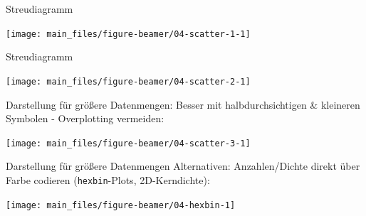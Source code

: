 \documentclass[
  10pt,
  ignorenonframetext,
]{beamer}
\begin{document}
\begin{frame}{Streudiagramm}
\label{streudiagramm}
\scriptsize

\begin{center}\texttt{[image: main\_files/figure-beamer/04-scatter-1-1]} \end{center}

\normalsize
\end{frame}

\begin{frame}{Streudiagramm}
\label{streudiagramm-1}
\scriptsize

\begin{center}\texttt{[image: main\_files/figure-beamer/04-scatter-2-1]} \end{center}

\normalsize
\end{frame}

\begin{frame}{Darstellung für größere Datenmengen:}
\label{darstellung-fuxfcr-gruxf6uxdfere-datenmengen}
Besser mit halbdurchsichtigen \& kleineren Symbolen - Overplotting
vermeiden: \scriptsize

\begin{center}\texttt{[image: main\_files/figure-beamer/04-scatter-3-1]} \end{center}

\normalsize
\end{frame}

\begin{frame}[fragile]{Darstellung für größere Datenmengen}
\label{darstellung-fuxfcr-gruxf6uxdfere-datenmengen-1}
Alternativen: Anzahlen/Dichte direkt über Farbe codieren
(\texttt{hexbin}-Plots, 2D-Kerndichte): \scriptsize

\begin{center}\texttt{[image: main\_files/figure-beamer/04-hexbin-1]} \end{center}

\normalsize
\end{frame}
\end{document}
